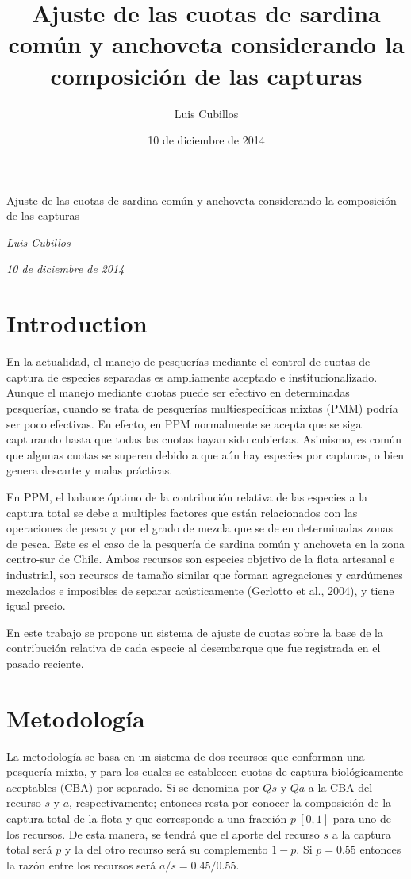\documentclass[]{article}
\title{Ajuste de las cuotas de sardina común y anchoveta considerando la
composición de las capturas}
\author{Luis Cubillos}
\date{10 de diciembre de 2014}
\begin{document}
\begin{center}
\huge Ajuste de las cuotas de sardina común y anchoveta considerando la
composición de las capturas \\[0.2cm]
\end{center}
\begin{center}
\large \emph{Luis Cubillos}\\[0.1cm]
\end{center}
\begin{center}
\large \emph{10 de diciembre de 2014} \\
\end{center}
\normalsize


\section{Introduction}\label{introduction}

En la actualidad, el manejo de pesquerías mediante el control de cuotas
de captura de especies separadas es ampliamente aceptado e
institucionalizado. Aunque el manejo mediante cuotas puede ser efectivo
en determinadas pesquerías, cuando se trata de pesquerías
multiespecíficas mixtas (PMM) podría ser poco efectivas. En efecto, en
PPM normalmente se acepta que se siga capturando hasta que todas las
cuotas hayan sido cubiertas. Asimismo, es común que algunas cuotas se
superen debido a que aún hay especies por capturas, o bien genera
descarte y malas prácticas.

En PPM, el balance óptimo de la contribución relativa de las especies a
la captura total se debe a multiples factores que están relacionados con
las operaciones de pesca y por el grado de mezcla que se de en
determinadas zonas de pesca. Este es el caso de la pesquería de sardina
común y anchoveta en la zona centro-sur de Chile. Ambos recursos son
especies objetivo de la flota artesanal e industrial, son recursos de
tamaño similar que forman agregaciones y cardúmenes mezclados e
imposibles de separar acústicamente (Gerlotto et al., 2004), y tiene
igual precio.

En este trabajo se propone un sistema de ajuste de cuotas sobre la base
de la contribución relativa de cada especie al desembarque que fue
registrada en el pasado reciente.

\section{Metodología}\label{metodologia}

La metodología se basa en un sistema de dos recursos que conforman una
pesquería mixta, y para los cuales se establecen cuotas de captura
biológicamente aceptables (CBA) por separado. Si se denomina por $Qs$ y
$Qa$ a la CBA del recurso $s$ y $a$, respectivamente; entonces resta por
conocer la composición de la captura total de la flota y que corresponde
a una fracción $p \ [0,1]$ para uno de los recursos. De esta manera, se
tendrá que el aporte del recurso $s$ a la captura total será $p$ y la
del otro recurso será su complemento $1-p$. Si $p=0.55$ entonces la
razón entre los recursos será $a/s= 0.45/0.55$.
\end{document}
